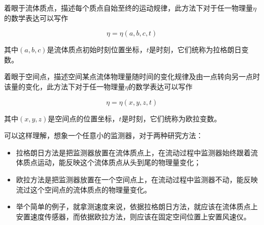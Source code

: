 


着眼于流体质点，描述每个质点自始至终的运动规律，此方法下对于任一物理量$\eta$的数学表达可以写作

\begin{equation}
	\eta = \eta(a, b, c, t)
\end{equation}

其中$(a, b, c)$是流体质点初始时刻位置坐标，$t$是时刻，它们统称为拉格朗日变数。


着眼于空间点，描述空间某点流体物理量随时间的变化规律及由一点转向另一点时该量的变化，此方法下对于任一物理量$\eta$的数学表达可以写作

\begin{equation}
	\eta = \eta(x, y, z, t)
\end{equation}

其中$(x, y, z)$是空间点的位置坐标，$t$是时刻，它们统称为欧拉变数。

\begin{tip}
	可以这样理解，想象一个任意小的监测器，对于两种研究方法：
	\begin{itemize}
		\item 拉格朗日方法是把监测器放置在流体质点上，在流动过程中监测器始终跟着流体质点运动，能反映这个流体质点从头到尾的物理量变化；
		\item 欧拉方法是把监测器放置在一个空间点上，在流动过程中监测器不动，能反映流过这个空间点的流体质点的物理量变化。
		\item 举个简单的例子，就拿测速度来说，依据拉格朗日方法，就应该在流体质点上安置速度传感器，而依据欧拉方法，则应该在固定空间位置上安置风速仪。
	\end{itemize}
\end{tip}


